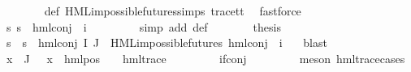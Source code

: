 \begin{isabellebody}
\ \ \ \ \ \ \isamarkupfalse%
\ {\isasymPsi}{\isacharunderscore}{\kern0pt}def\ HML{\isacharunderscore}{\kern0pt}impossible{\isacharunderscore}{\kern0pt}futures{\isachardot}{\kern0pt}simps\ trace{\isacharunderscore}{\kern0pt}tt\ \isamarkupfalse%
\ fastforce\isanewline
\ \ \ \isamarkupfalse%
\ {\isachardoublequoteopen}{\isasymforall}s{\isachardot}{\kern0pt}\ {\isasymnot}s\ {\isasymTurnstile}\ {\isacharparenleft}{\kern0pt}hml{\isacharunderscore}{\kern0pt}conj\ {\isacharbraceleft}{\kern0pt}{\isacharbraceright}{\kern0pt}\ {\isacharbraceleft}{\kern0pt}i{\isacharunderscore}{\kern0pt}{\isasymphi}{\isacharbraceright}{\kern0pt}\ {\isasymPsi}{\isacharparenright}{\kern0pt}{\isachardoublequoteclose}\isanewline
\ \ \ \ \ \ \isamarkupfalse%
\ {\isacharparenleft}{\kern0pt}simp\ add{\isacharcolon}{\kern0pt}\ {\isasymPsi}{\isacharunderscore}{\kern0pt}def{\isacharparenright}{\kern0pt}\isanewline
\ \ \ \ \isamarkupfalse%
\ \isamarkupfalse%
\ {\isacharquery}{\kern0pt}thesis\ \isanewline
\ \ \ \ \ \ \isamarkupfalse%
\ {\isacartoucheopen}{\isasymforall}s{\isachardot}{\kern0pt}\ {\isasymnot}\ s\ {\isasymTurnstile}\ hml{\isacharunderscore}{\kern0pt}conj\ I\ J\ {\isasymPhi}{\isacartoucheclose}\ {\isacartoucheopen}HML{\isacharunderscore}{\kern0pt}impossible{\isacharunderscore}{\kern0pt}futures\ {\isacharparenleft}{\kern0pt}hml{\isacharunderscore}{\kern0pt}conj\ {\isacharbraceleft}{\kern0pt}{\isacharbraceright}{\kern0pt}\ {\isacharbraceleft}{\kern0pt}i{\isacharunderscore}{\kern0pt}{\isasymphi}{\isacharbraceright}{\kern0pt}\ {\isasymPsi}{\isacharparenright}{\kern0pt}{\isacartoucheclose}\ \isamarkupfalse%
\ blast\isanewline
\ \ \isamarkupfalse%
\isanewline
\ \ \ \ \isamarkupfalse%
\ {}\isanewline
\ \ \ \ \isamarkupfalse%
\ {\isachardoublequoteopen}{\isasymforall}x\ {\isasymin}\ {\isasymPhi}{\isacharbackquote}{\kern0pt}J{\isachardot}{\kern0pt}\ {\isasymexists}{\isasymalpha}\ {\isasymphi}{\isachardot}{\kern0pt}\ x\ {\isacharequal}{\kern0pt}\ {\isacharparenleft}{\kern0pt}hml{\isacharunderscore}{\kern0pt}pos\ {\isasymalpha}\ {\isasymphi}{\isacharparenright}{\kern0pt}\ {\isasymand}\ hml{\isacharunderscore}{\kern0pt}trace\ {\isasymphi}{\isachardoublequoteclose}\isanewline
\ \ \ \ \ \ \isamarkupfalse%
\ if{\isacharunderscore}{\kern0pt}conj\ \isanewline
\ \ \ \ \ \ \isamarkupfalse%
\ {\isacharparenleft}{\kern0pt}meson\ hml{\isacharunderscore}{\kern0pt}trace{\isachardot}{\kern0pt}cases{\isacharparenright}{\kern0pt}\isanewline

\end{isabellebody}

